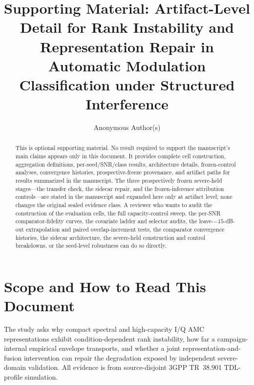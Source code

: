 \documentclass[letterpaper,onecolumn,11pt,journal]{IEEEtran}
\title{Supporting Material: Artifact-Level Detail for Rank Instability and
Representation Repair in Automatic Modulation Classification under Structured
Interference}
\author{Anonymous Author(s)}
\begin{document}
\maketitle

\begin{abstract}
This is optional supporting material. No result required to support the
manuscript's main claims appears only in this document. It provides complete
cell construction, aggregation definitions, per-seed/SNR/class results,
architecture details, frozen-control analyses, convergence histories,
prospective-freeze provenance, and artifact paths for results summarized in the
manuscript. The three prospectively frozen severe-held stages---the transfer
check, the sidecar repair, and the frozen-inference attribution controls---are
stated in the manuscript and expanded here only at artifact level; none
changes the original sealed evidence class. A reviewer who wants to audit the
construction of the evaluation cells, the full capacity-control sweep, the
per-SNR comparator-fidelity curves, the covariate ladder and selector audits,
the leave-$-15$-dB-out extrapolation and paired overlap-increment tests, the
comparator convergence histories, the sidecar architecture, the severe-held
construction and control breakdowns, or the seed-level robustness can do so
directly.
\end{abstract}

\section{Scope and How to Read This Document}
The study asks why compact spectral and high-capacity I/Q AMC representations
exhibit condition-dependent rank instability, how far a campaign-internal
empirical envelope transports, and whether a joint representation-and-fusion
intervention can repair the degradation exposed by independent severe-domain
validation. All
evidence is from source-disjoint 3GPP TR~38.901 TDL-profile simulation.
\end{document}
